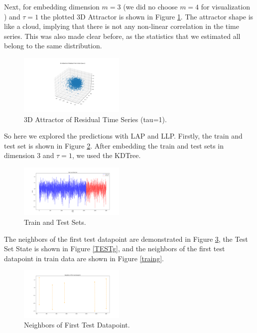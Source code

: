 \documentclass[conference]{IEEEtran}
\begin{document}
Next, for embedding dimension $m = 3$ (we did no choose $m = 4$ for visualization ) and $\tau = 1$ the plotted 3D Attractor is shown in Figure \ref{attg}. The attractor shape is like a cloud, implying that there is not any non-linear correlation in the time series. This was also made clear before, as the statistics that we estimated all belong to the same distribution. 

\begin{figure}[ht]
    \centering
    \includegraphics[width=0.45\textwidth]{Figures/GlasnevinNonLin/3D Attractor of Residual Time Series (tau=1).png}
    \caption{3D Attractor of Residual Time Series (tau=1).}
    \label{attg}
\end{figure}

So here we explored the predictions with LAP and LLP. Firstly, the train and test set is shown in Figure \ref{trg}. After embedding the train and test sets in dimension 3 and $\tau = 1$, we used the KDTree. 

\begin{figure}[ht]
    \centering
    \includegraphics[width=0.45\textwidth]{Figures/GlasnevinNonLin/Train and Test Set.png}
    \caption{Train and Test Sets.}
    \label{trg}
\end{figure}

The neighbors of the first test datapoint are demonstrated in Figure \ref{ndatg}, the Test Set State is shown in Figure \ref{TESTg}, and the neighbors of the first test datapoint in train data are shown in Figure \ref{traing}.

\begin{figure}[ht]
    \centering
    \includegraphics[width=0.45\textwidth]{Figures/GlasnevinNonLin/Neighbors of first test datapoint.png}
    \caption{Neighbors of First Test Datapoint.}
    \label{ndatg}
\end{figure}
\end{document}
